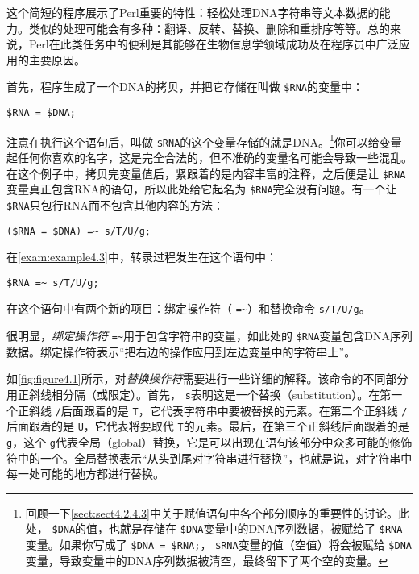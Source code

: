 这个简短的程序展示了Perl重要的特性：轻松处理DNA字符串等文本数据的能力。类似的处理可能会有多种：翻译、反转、替换、删除和重排序等等。总的来说，Perl在此类任务中的便利是其能够在生物信息学领域成功及在程序员中广泛应用的主要原因。

首先，程序生成了一个DNA的拷贝，并把它存储在叫做 \verb|$RNA|的变量中：

\begin{lstlisting}
$RNA = $DNA;
\end{lstlisting}

注意在执行这个语句后，叫做 \verb|$RNA|的这个变量存储的就是DNA。\footnote{回顾一下\autoref{sect:sect4.2.4.3}中关于赋值语句中各个部分顺序的重要性的讨论。此处， \verb|$DNA|的值，也就是存储在 \verb|$DNA|变量中的DNA序列数据，被赋给了 \verb|$RNA|变量。如果你写成了 \verb|$DNA = $RNA;|， \verb|$RNA|变量的值（空值）将会被赋给 \verb|$DNA|变量，导致变量中的DNA序列数据被清空，最终留下了两个空的变量。}你可以给变量起任何你喜欢的名字，这是完全合法的，但不准确的变量名可能会导致一些混乱。在这个例子中，拷贝完变量值后，紧跟着的是内容丰富的注释，之后便是让 \verb|$RNA|变量真正包含RNA的语句，所以此处给它起名为 \verb|$RNA|完全没有问题。有一个让 \verb|$RNA|只包行RNA而不包含其他内容的方法：

\begin{lstlisting}
($RNA = $DNA) =~ s/T/U/g;
\end{lstlisting}

在\autoref{exam:example4.3}中，转录过程发生在这个语句中：

\begin{lstlisting}
$RNA =~ s/T/U/g;
\end{lstlisting}

在这个语句中有两个新的项目：绑定操作符（ \verb|=~|）和替换命令 \verb|s/T/U/g|。

很明显，\textit{绑定操作符} \verb|=~|用于包含字符串的变量，如此处的 \verb|$RNA|变量包含DNA序列数据。绑定操作符表示“把右边的操作应用到左边变量中的字符串上”。

如\autoref{fig:figure4.1}所示，对\textit{替换操作符}需要进行一些详细的解释。该命令的不同部分用正斜线相分隔（或限定）。首先， \verb|s|表明这是一个替换（substitution）。在第一个正斜线 \verb|/|后面跟着的是 \verb|T|，它代表字符串中要被替换的元素。在第二个正斜线 \verb|/|后面跟着的是 \verb|U|，它代表将要取代 \verb|T|的元素。最后，在第三个正斜线后面跟着的是 \verb|g|，这个 \verb|g|代表全局（global）替换，它是可以出现在语句该部分中众多可能的修饰符中的一个。全局替换表示“从头到尾对字符串进行替换”，也就是说，对字符串中每一处可能的地方都进行替换。

